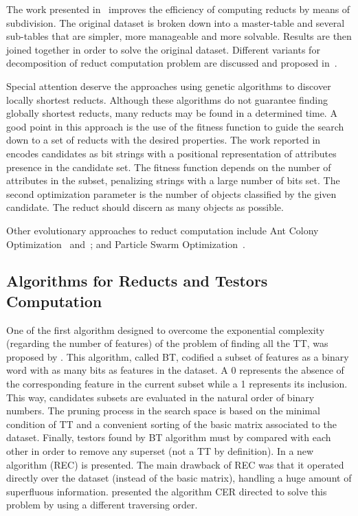 \documentclass[authoryear,11pt]{elsarticle}
\begin{document}
  The work presented in~\citep{Jiao10} improves the efficiency of computing reducts by means of subdivision. The 
  original dataset is broken down into a master-table and several sub-tables that are simpler, more manageable 
  and more solvable. Results are then joined together in order to solve the original dataset. Different variants
  for decomposition of reduct computation problem are discussed and proposed in~\citep{Strakowski08}.
  
  Special attention deserve the approaches using genetic algorithms to discover locally shortest reducts. Although 
  these algorithms do not guarantee finding globally shortest reducts, many reducts may be found in a determined
  time. A good point in this approach is the use of the fitness function to guide the search down to a set of 
  reducts with the desired properties. The work reported in~\citep{Wroblewski95} encodes candidates as bit 
  strings with a positional representation of attributes presence in the candidate set. The fitness function
  depends on the number of attributes in the subset, penalizing strings with a large number of bits set. The 
  second optimization parameter is the number of objects classified by the given candidate. The reduct should 
  discern as many objects as possible.
  
  Other evolutionary approaches to reduct computation include Ant Colony Optimization~\citep{Jensen03}
  and~\citep{Chen10}; and Particle Swarm Optimization~\citep{Wang07}.
    
\subsection{Algorithms for Reducts and Testors Computation}
  One of the first algorithm designed to overcome the exponential complexity (regarding
  the number of features) of the problem of finding all the TT, was 
  proposed by \cite{Ruiz85}. This algorithm, called BT,
  codified a subset of features as a binary word with as many bits as features in the 
  dataset. A 0 represents the absence of the corresponding feature in the current
  subset while a 1 represents its inclusion. This way, candidates subsets are evaluated
  in the natural order of binary numbers. The pruning process in the
  search space is based on the minimal condition of TT and a convenient sorting
  of the basic matrix associated to the dataset. Finally, 
  testors found by BT algorithm must by compared with each other in order to remove
  any superset (not a TT by definition).
  In \citep{Shulcloper95b} a new algorithm (REC) is presented.
  The main drawback of REC was that it operated directly over the dataset (instead of the
  basic matrix), handling a huge amount of superfluous information. \cite{Ayaquica97}
  presented the algorithm CER directed to solve this problem by using a different traversing
  order. 
	
\end{document}
